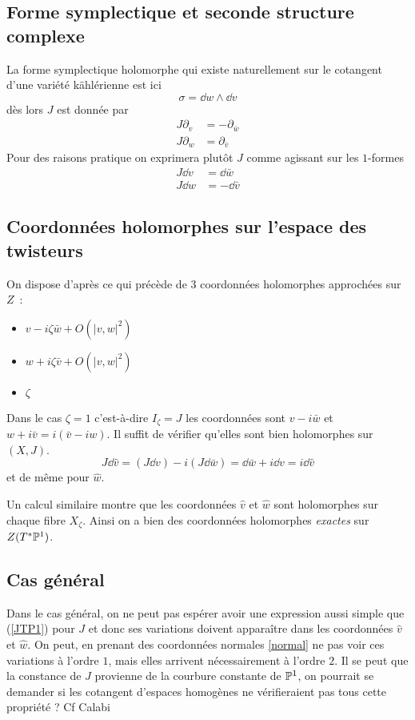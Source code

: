 \documentclass[11pt,draft,twocolumn,makeidx]{amsart}
\numberwithin{equation}{subsection}
\begin{document}
\subsection{Forme symplectique et seconde structure complexe} La forme symplectique holomorphe qui existe naturellement sur le cotangent d'une variété kählérienne est ici
\begin{equation}
\sigma = \dd w \wedge \dd v
\end{equation}
dès lors $J$ est  donnée par
\begin{align}\label{JTP1}
J \partial_v &= -\partial_{\bar{w}}\\
J \partial_w &= \partial_{\bar{v}}
\end{align}
Pour des raisons pratique on exprimera plutôt $J$ comme agissant sur les $1$-formes
\begin{align}
J \dd v &= \dd {\bar{w}}\\
J \dd w &= -\dd {\bar{v}}
\end{align}
\subsection{Coordonnées holomorphes sur l'espace des twisteurs} On dispose d'après ce qui précède de $3$ coordonnées holomorphes approchées sur $Z$~:
\begin{itemize}
\item $v-i\zeta \bar{w} + O(|v,w|^2)$
\item $w +i\zeta \bar{v} + O(|v,w|^2)$
\item $\zeta$
\end{itemize}

Dans le cas $\zeta = 1$ c'est-à-dire $I_\zeta = J$ les coordonnées sont $v-i\bar{w}$ et $w+i\bar{v} = i(\bar{v} - iw)$. Il suffit de vérifier qu'elles sont bien holomorphes sur $(X,J)$. 
\begin{equation}
J \dd \hat{v} = (J \dd v) - i (J\dd \bar{w}) = \dd \bar{w} + i \dd v = i \dd \hat{v}
\end{equation}
et de même pour $\hat{w}$. 

Un calcul similaire montre que les coordonnées $\hat{v}$ et $\hat{w}$ sont holomorphes sur chaque fibre $X_\zeta$. Ainsi on a bien des coordonnées holomorphes \emph{exactes} sur $Z(T^* \mathbb{P}^1)$.

\subsection{Cas général} Dans le cas général, on ne peut pas espérer avoir une expression aussi simple que ({\autoref{JTP1}}) pour $J$ et donc ses variations doivent apparaître dans les coordonnées $\hat{v}$ et $\hat{w}$. On peut, en prenant des coordonnées normales {\autoref{normal}} ne pas voir ces variations à l'ordre $1$, mais elles arrivent nécessairement à l'ordre $2$. Il se peut que la constance de $J$ provienne de la courbure constante de $\mathbb{P}^1$, on pourrait se demander si les cotangent d'espaces homogènes ne vérifieraient pas tous cette propriété ? Cf Calabi \?









\end{document}
